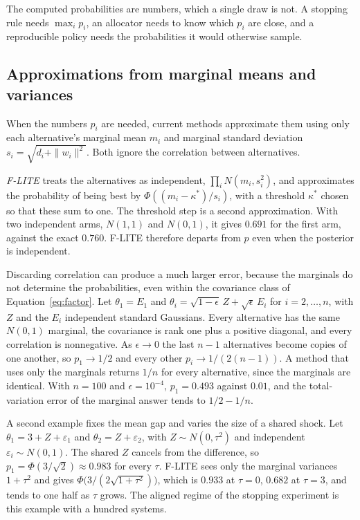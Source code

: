 \documentclass[11pt]{article}
\begin{document}
The computed probabilities are numbers, which a single draw is not. A stopping rule needs $\max_i p_i$, an allocator needs to
know which $p_i$ are close, and a reproducible policy needs the
probabilities it would otherwise sample.

\subsection{Approximations from marginal means and variances}

When the numbers $p_i$ are needed, current methods approximate them
using only each alternative's marginal mean $m_i$ and marginal
standard deviation $s_i = \sqrt{d_i + \|w_i\|^2}$. Both ignore the
correlation between alternatives.

\emph{F-LITE} \citep{menet2025} treats the alternatives as
independent, $\prod_i N(m_i, s_i^2)$, and approximates the
probability of being best by $\Phi((m_i - \kappa^*)/s_i)$, with a
threshold $\kappa^*$ chosen so that these sum to one. The threshold
step is a second approximation. With two independent arms, $N(1,1)$
and $N(0,1)$, it gives $0.691$ for the first arm, against the exact
$0.760$. F-LITE therefore departs from $p$ even when the posterior is
independent.

Discarding correlation can produce a much larger error, because the
marginals do not determine the probabilities, even within the covariance
class of Equation~\eqref{eq:factor}. Let $\theta_1 = E_1$ and
$\theta_i = \sqrt{1 - \epsilon}\, Z + \sqrt{\epsilon}\, E_i$ for
$i = 2, \dots, n$, with $Z$ and the $E_i$ independent standard
Gaussians. Every alternative has the same $N(0, 1)$ marginal, the
covariance is rank one plus a positive diagonal, and every correlation
is nonnegative. As $\epsilon \to 0$ the last $n - 1$ alternatives
become copies of one another, so $p_1 \to 1/2$ and every other $p_i
\to 1/(2(n-1))$. A method that uses only the marginals returns $1/n$
for every alternative, since the marginals are identical. With
$n = 100$ and $\epsilon = 10^{-4}$, $p_1 = 0.493$ against $0.01$, and
the total-variation error of the marginal answer tends to
$1/2 - 1/n$.

A second example fixes the mean gap and varies the size of a shared
shock. Let $\theta_1 = 3 + Z + \varepsilon_1$ and
$\theta_2 = Z + \varepsilon_2$, with $Z \sim N(0, \tau^2)$ and
independent $\varepsilon_i \sim N(0, 1)$. The shared $Z$ cancels from
the difference, so $p_1 = \Phi(3/\sqrt{2}) \approx 0.983$ for every
$\tau$. F-LITE sees only the marginal variances $1 + \tau^2$ and gives
$\Phi\bigl(3 / (2\sqrt{1 + \tau^2})\bigr)$, which is $0.933$ at
$\tau = 0$, $0.682$ at $\tau = 3$, and tends to one half as $\tau$
grows. The aligned regime of the stopping experiment is this example
with a hundred systems.
\end{document}
